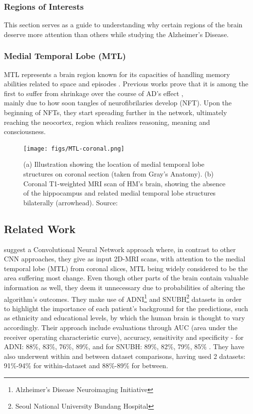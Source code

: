 \documentclass[a4paper, 12pt]{article}
\begin{document}
\subsubsection{Regions of Interests}
This section serves as a guide to understanding why certain regions of the brain deserve more attention than others while
studying the Alzheimer's Disease.

\subsubsection*{Medial Temporal Lobe (MTL)}
MTL represents a brain region known for its capacities of handling memory abilities related to space and episodes \cite{10.3389/fnsys.2017.00019}.
Previous works prove that it is among the first to suffer from shrinkage over the course of AD's effect \cite{deFlores2131}, \\
mainly due to how soon tangles of neurofibrilaries develop (NFT). Upon the beginning of NFTs, they start spreading further in the network,
ultimately reaching the neocortex, region which realizes reasoning, meaning and consciousness.

\begin{figure}[htbp]
    \centering
    \texttt{[image: figs/MTL-coronal.png]}
    \caption{(a) Illustration showing the location of medial temporal lobe structures on coronal section
        (taken from Gray's Anatomy). (b) Coronal T1-weighted MRI scan of HM's brain, showing the absence of the
        hippocampus and related medial temporal lobe structures bilaterally (arrowhead). Source: \cite{MTL-image}}
    \label{fig:MTL}
\end{figure}


\newpage
\newpage

\subsection{Related Work} %
\cite{bae2020} suggest a Convolutional Neural Network approach where, in contrast to other CNN approaches, they give as input
2D-MRI scans, with attention to the medial temporal lobe (MTL) from coronal slices, MTL being widely considered to be the
area suffering most change. Even though other parts of the brain contain valuable information as well, they deem it
unnecessary due to probabilities of altering the algorithm's outcomes. They make use of ADNI\footnote{Alzheimer's Disease Neuroimaging Initiative}
and SNUBH\footnote{Seoul National University Bundang Hospital} datasets in order to highlight the importance of each patient's background for
the predictions, such as ethnicity and educational levels, by which the human brain is thought to vary accordingly.
Their approach include evaluations through AUC (area under the receiver operating characteristic curve), accuracy, sensitivity and specificity
- for ADNI: 88\%, 83\%, 76\%, 89\%, and for SNUBH: 89\%, 82\%, 79\%, 85\% . They have also underwent within and between dataset comparisons,
having used 2 datasets: 91\%-94\% for within-dataset and 88\%-89\% for between.
\end{document}
